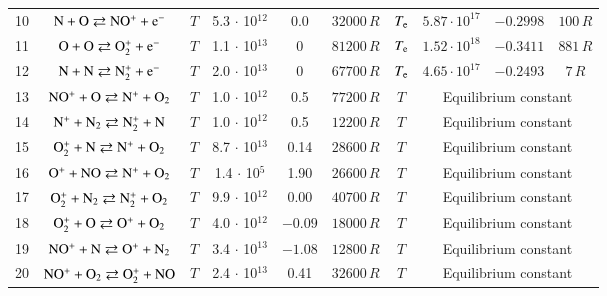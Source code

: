 \documentclass{warpdoc}
\begin{document}
\begin{table}[t]
\begin{center}
\begin{threeparttable}
\begin{tabular}{cccccccccc}
10 & $\rm N + O \rightleftarrows NO^+ + e^- $ & $T$  & 5.3 $\cdot$ 10$^{12}$  & 0.0 & $32000 \, R$ & $T_{\rm e}$ & $5.87 \cdot 10^{17}$ & $-0.2998$ & $100 \, R$ \\

11 & $\rm O + O \rightleftarrows O_2^+ + e^- $ & $T$  & 1.1 $\cdot$ 10$^{13}$  & 0 & $81200 \, R$ & $T_{\rm e}$ & $1.52 \cdot 10^{18}$ & $-0.3411$ & $881\, R$\\

12 & $\rm N + N \rightleftarrows N_2^+ + e^- $ & $T$ & 2.0 $\cdot$ 10$^{13}$  & 0 & $67700 \, R$ & $T_{\rm e}$ &  $4.65 \cdot 10^{17}$ & $-0.2493$ & $7\, R$ \\




13 & $\rm NO^+ + O \rightleftarrows N^+ + O_2 $ & $T$   & 1.0 $\cdot$ 10$^{12}$  & 0.5 & $77200 \, R$ & $T$& \multicolumn{3}{c}{Equilibrium constant}\\




14 & $\rm N^+ + N_2 \rightleftarrows N_2^+ + N $ & $T$   & 1.0 $\cdot$ 10$^{12}$  & 0.5 & $12200 \, R$ & $T$ & \multicolumn{3}{c}{Equilibrium constant}\\



15 & $\rm O_2^+ + N \rightleftarrows N^+ + O_2 $ & $T$   & 8.7 $\cdot$ 10$^{13}$  & 0.14 & $28600 \, R$ & $T$ & \multicolumn{3}{c}{Equilibrium constant}\\

16 & $\rm O^+ + NO \rightleftarrows N^+ + O_2 $ & $T$  & 1.4 $\cdot$ 10$^{5}$  & 1.90 & $26600 \, R$ & $T$  & \multicolumn{3}{c}{Equilibrium constant}\\





17 & $\rm O_2^+ + N_2 \rightleftarrows N_2^+ + O_2 $ & $T$   & 9.9 $\cdot$ 10$^{12}$  & 0.00 & $40700 \, R$ & $T$ & \multicolumn{3}{c}{Equilibrium constant}\\

18 & $\rm O_2^+ + O \rightleftarrows O^+ + O_2 $ & $T$   & 4.0 $\cdot$ 10$^{12}$  & $-0.09$ & $18000 \, R$ & $T$ & \multicolumn{3}{c}{Equilibrium constant}\\

19 & $\rm NO^+ + N \rightleftarrows O^+ + N_2 $ & $T$   & 3.4 $\cdot$ 10$^{13}$  & $-1.08$ & $12800 \, R$ & $T$ & \multicolumn{3}{c}{Equilibrium constant}\\

20 & $\rm NO^+ + O_2 \rightleftarrows O_2^+ + NO $ & $T$   & 2.4 $\cdot$ 10$^{13}$  & 0.41 & $32600 \, R$ & $T$ & \multicolumn{3}{c}{Equilibrium constant}\\


\end{tabular}
\end{threeparttable}
\end{center}
\end{table}
\end{document}
